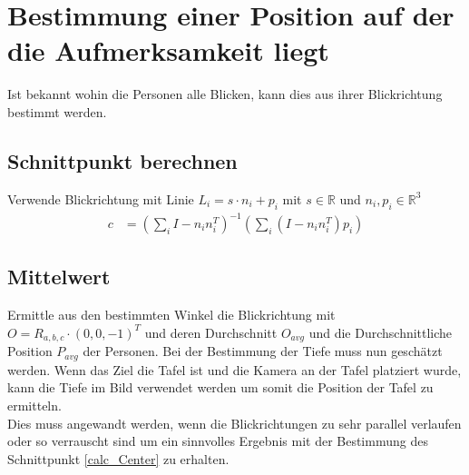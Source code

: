 \section{Bestimmung einer Position auf der die Aufmerksamkeit liegt}
Ist bekannt wohin die Personen alle Blicken, kann dies aus ihrer Blickrichtung bestimmt werden.
\subsection{Schnittpunkt berechnen}
\label{calc_Center}
Verwende Blickrichtung mit Linie $L_i = s \cdot n_i+ p_i$ mit $s\in \mathbb{R}$ und $n_i,p_i \in \mathbb{R}^3$
\begin{align*}
c&=(\sum_{i} I -n_in_i^T)^{-1}
(\sum_{i} (I -n_in_i^T)p_i)
\end{align*}
\subsection{Mittelwert}
Ermittle aus den bestimmten Winkel die Blickrichtung mit $O= R_{a,b,c}\cdot (0,0,-1)^T$ und deren Durchschnitt $O_{avg}$ und die Durchschnittliche Position $P_{avg}$ der Personen. Bei der Bestimmung der Tiefe muss nun geschätzt werden. Wenn das Ziel die Tafel ist und die Kamera an der Tafel platziert wurde, kann die Tiefe im Bild verwendet werden um somit die Position der Tafel zu ermitteln.\\
Dies muss angewandt werden, wenn die Blickrichtungen zu sehr parallel verlaufen oder so verrauscht sind um ein sinnvolles Ergebnis mit der Bestimmung des Schnittpunkt \autoref{calc_Center} zu erhalten.